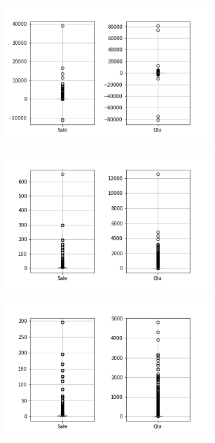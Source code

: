 \begin{figure}
\begin{subfigure}{.32\textwidth}
\centering
\includegraphics[width=\textwidth]{img/understanding/boxplots_before.png}
\caption{}
\label{fig:sale_qta_boxplots_before}
\end{subfigure}
\begin{subfigure}{.32\textwidth}
\centering
\captionsetup{justification=centering}
\includegraphics[width=\textwidth]{img/understanding/boxplots_after1.png}
\caption{}
\label{fig:sale_qta_boxplots_after1}
\end{subfigure}
\begin{subfigure}{.32\textwidth}
\centering
\captionsetup{justification=centering}
\includegraphics[width=\textwidth]{img/understanding/boxplots_after2.png}

\end{subfigure}
\end{figure}
